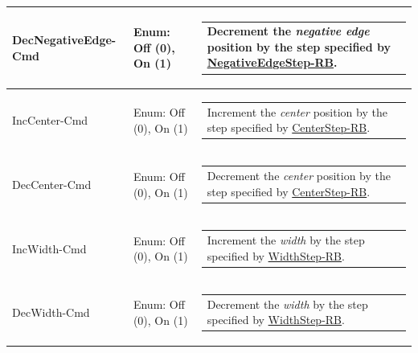\documentclass[openany]{article}
\begin{document}
\begin{longtable}{| m{4.5cm} m{2.5cm}  m{7.0cm} |}
        DecNegativeEdge-Cmd & Enum: Off (0), On (1) & \begin{tabular}{@{}m{6cm}@{}}
                Decrement the \emph{negative edge} position by the step specified by \hyperlink{pv:negative-edge-step}{NegativeEdgeStep-RB}.
            \end{tabular} \hypertarget{pv:inc-center-cmd}{}\\ \hline
        IncCenter-Cmd & Enum: Off (0), On (1) & \begin{tabular}{@{}m{6cm}@{}}
                Increment the \emph{center} position by the step specified by \hyperlink{pv:center-step}{CenterStep-RB}.
            \end{tabular} \hypertarget{pv:dec-center-cmd}{}\\ \hline
        DecCenter-Cmd & Enum: Off (0), On (1) & \begin{tabular}{@{}m{6cm}@{}}
                Decrement the \emph{center} position by the step specified by \hyperlink{pv:center-step}{CenterStep-RB}.
            \end{tabular} \hypertarget{pv:inc-width-cmd}{}\\ \hline
        IncWidth-Cmd & Enum: Off (0), On (1) & \begin{tabular}{@{}m{6cm}@{}}
                Increment the \emph{width} by the step specified by \hyperlink{pv:width-step}{WidthStep-RB}.
            \end{tabular} \hypertarget{pv:dec-width-cmd}{}\\ \hline
        DecWidth-Cmd & Enum: Off (0), On (1) & \begin{tabular}{@{}m{6cm}@{}}
                Decrement the \emph{width} by the step specified by \hyperlink{pv:width-step}{WidthStep-RB}.
            \end{tabular} \hypertarget{}{}\\ \hline
    \end{longtable}
\end{document}
